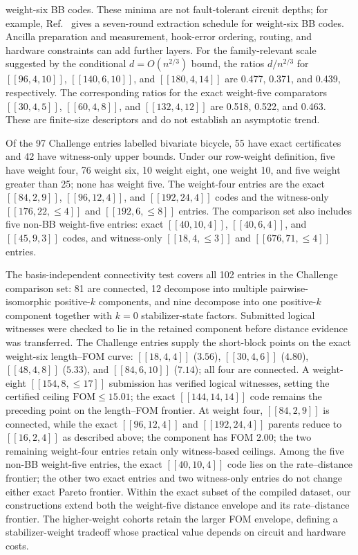 \documentclass[aps,prx,twocolumn,superscriptaddress,nofootinbib,floatfix]{revtex4-2}
\newcommand{\code}[1]{\ensuremath{\left[\!\left[#1\right]\!\right]}}
\newcommand{\FOM}{\ensuremath{\mathrm{FOM}}}
\begin{document}
weight-six BB codes.  These minima are not fault-tolerant circuit depths; for
example, Ref.~\cite{bravyi2024high} gives a seven-round extraction schedule
for weight-six BB codes.  Ancilla preparation and measurement, hook-error
ordering, routing, and hardware constraints can add further layers.
For the family-relevant scale suggested by the conditional
$d=O(n^{2/3})$ bound, the ratios $d/n^{2/3}$ for
$\code{96,4,10}$, $\code{140,6,10}$, and $\code{180,4,14}$ are 0.477,
0.371, and 0.439, respectively.  The corresponding ratios for the exact
weight-five comparators $\code{30,4,5}$, $\code{60,4,8}$, and
$\code{132,4,12}$ are 0.518, 0.522, and 0.463.  These are finite-size
descriptors and do not establish an asymptotic trend.

Of the 97 Challenge entries labelled bivariate bicycle, 55 have exact
certificates and 42 have witness-only upper bounds.  Under our row-weight
definition, five have weight four, 76 weight six, 10 weight eight, one weight
10, and five weight greater than 25; none has weight five.  The weight-four
entries are the exact $\code{84,2,9}$, $\code{96,12,4}$, and
$\code{192,24,4}$ codes and the witness-only $\code{176,22,{\leq}4}$ and
$\code{192,6,{\leq}8}$ entries.  The comparison set also includes five non-BB
weight-five entries: exact $\code{40,10,4}$, $\code{40,6,4}$, and
$\code{45,9,3}$ codes, and witness-only $\code{18,4,{\leq}3}$ and
$\code{676,71,{\leq}4}$ entries.

The basis-independent connectivity test covers all 102 entries in the
Challenge comparison set: 81 are connected, 12 decompose into multiple
pairwise-isomorphic positive-$k$ components, and nine decompose into one
positive-$k$ component together with $k=0$ stabilizer-state factors.  Submitted
logical witnesses were checked to lie in the retained component before distance
evidence was transferred.  The Challenge entries supply the short-block
points on the exact weight-six length--FOM curve: $\code{18,4,4}$ ($3.56$),
$\code{30,4,6}$ ($4.80$), $\code{48,4,8}$ ($5.33$), and
$\code{84,6,10}$ ($7.14$); all four are connected.  A weight-eight
$\code{154,8,{\leq}17}$ submission has verified logical
witnesses, setting the certified ceiling $\FOM\leq15.01$; the exact
$\code{144,14,14}$ code remains the preceding point on the length--FOM
frontier.  At weight four,
$\code{84,2,9}$ is connected, while the exact $\code{96,12,4}$ and
$\code{192,24,4}$ parents reduce to $\code{16,2,4}$ as described above; the
component has FOM $2.00$; the two remaining weight-four entries retain only
witness-based ceilings.  Among the five non-BB weight-five entries, the exact
$\code{40,10,4}$ code lies on the rate--distance frontier; the other two exact
entries and two witness-only entries do not change either exact Pareto frontier.
Within the exact subset of the compiled dataset, our constructions extend both
the weight-five distance envelope and its rate--distance frontier.  The
higher-weight cohorts retain the larger FOM envelope, defining a
stabilizer-weight tradeoff whose practical value depends on circuit and
hardware costs.
\end{document}
